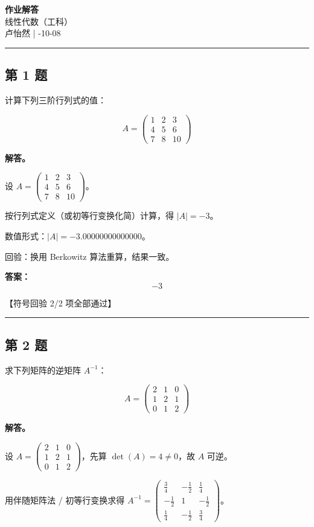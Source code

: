 \documentclass[12pt, a4paper]{article}
\newcommand{\problem}[1]{\subsection*{第 #1 题}}
\newcommand{\solution}{\textbf{解答。}}
\begin{document}
\begin{center}
    {\LARGE\bfseries 作业解答} \\[0.5em]
    {\large 线性代数（工科）} \\[0.3em]
    卢怡然 \quad | -10-08
\end{center}

\hrule
\vspace{1em}
\setlength{\parskip}{0.35em}
\problem{1}

计算下列三阶行列式的值：

$$
A = \begin{pmatrix} 1 & 2 & 3 \\ 4 & 5 & 6 \\ 7 & 8 & 10 \end{pmatrix}
$$

\solution

设 $A = \begin{pmatrix} 1 & 2 & 3 \\ 4 & 5 & 6 \\ 7 & 8 & 10 \end{pmatrix}$。

按行列式定义（或初等行变换化简）计算，得 $|A| = -3$。

数值形式：$|A| = -3.00000000000000$。

回验：换用 Berkowitz 算法重算，结果一致。

\textbf{答案：}
\[\boxed{-3}\]

\textcolor{okgreen}{【符号回验 2/2 项全部通过】}

\vspace{0.8em}
\hrule
\vspace{0.8em}

\problem{2}

求下列矩阵的逆矩阵 $A^{-1}$：

$$
A = \begin{pmatrix} 2 & 1 & 0 \\ 1 & 2 & 1 \\ 0 & 1 & 2 \end{pmatrix}
$$

\solution

设 $A = \begin{pmatrix} 2 & 1 & 0 \\ 1 & 2 & 1 \\ 0 & 1 & 2 \end{pmatrix}$，先算 $\det(A) = 4 \neq 0$，故 $A$ 可逆。

用伴随矩阵法 / 初等行变换求得 $A^{-1} = \begin{pmatrix} \frac{3}{4} & - \frac{1}{2} & \frac{1}{4} \\ - \frac{1}{2} & 1 & - \frac{1}{2} \\ \frac{1}{4} & - \frac{1}{2} & \frac{3}{4} \end{pmatrix}$。
\end{document}
